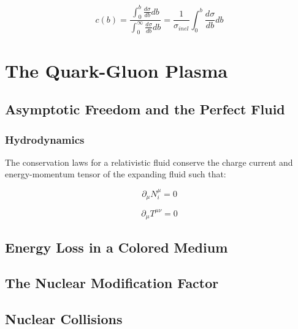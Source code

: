 \begin{equation}
c(b) =\frac{ \int_{0}^{b} \frac{d \sigma}{db} db}{ \int_{0}^{\infty} \frac{d \sigma}{db} db} = \frac{1}{\sigma_{inel}} \int_{0}^{b} \frac{d \sigma}{db} db
\label{eq:centrality}
\end{equation}






\section{The Quark-Gluon Plasma}

\subsection{Asymptotic Freedom and the Perfect Fluid}

\subsubsection{Hydrodynamics}
The conservation laws for a relativistic fluid conserve the charge current and energy-momentum tensor of the expanding fluid such that:

\begin{equation}
\partial_{\mu} N_{\textit{i}}^{\mu} = 0
\label{eq:hydrochrg}
\end{equation}

\begin{equation}
\partial_{\mu} T^{\mu \nu} = 0
\label{eq:hydroenrgy}
\end{equation}

\subsection{Energy Loss in a Colored Medium}

\subsection{The Nuclear Modification Factor}

\subsection{Nuclear Collisions}


